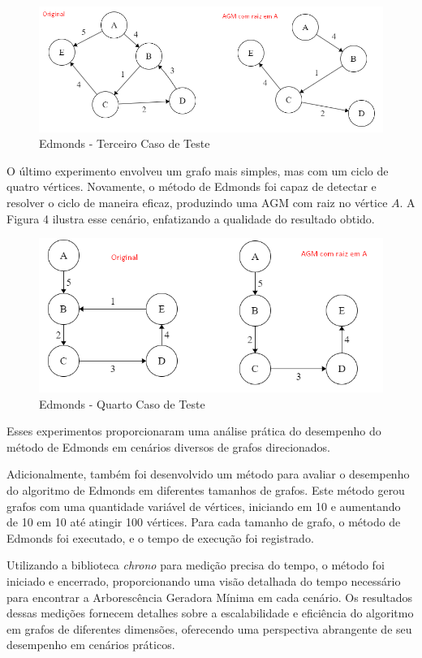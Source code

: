 \documentclass[12pt]{article}
\begin{document}
\begin{figure}[ht]
\centering
\includegraphics[width=.8\textwidth]{AGM/Exemplo 3.png}
\caption{Edmonds - Terceiro Caso de Teste}
\end{figure}

O último experimento envolveu um grafo mais simples, mas com um ciclo de quatro vértices. Novamente, o método de Edmonds foi capaz de detectar e resolver o ciclo de maneira eficaz, produzindo uma AGM com raiz no vértice \(A\). A Figura 4 ilustra esse cenário, enfatizando a qualidade do resultado obtido.

\begin{figure}[ht]
\centering
\includegraphics[width=.65\textwidth]{AGM/Exemplo 4.png}
\caption{Edmonds - Quarto Caso de Teste}
\end{figure}

Esses experimentos proporcionaram uma análise prática do desempenho do método de Edmonds em cenários diversos de grafos direcionados. 

Adicionalmente, também foi desenvolvido um método para avaliar o desempenho do algoritmo de Edmonds em diferentes tamanhos de grafos. Este método gerou grafos com uma quantidade variável de vértices, iniciando em 10 e aumentando de 10 em 10 até atingir 100 vértices. Para cada tamanho de grafo, o método de Edmonds foi executado, e o tempo de execução foi registrado. 

Utilizando a biblioteca \textit{chrono} para medição precisa do tempo, o método foi iniciado e encerrado, proporcionando uma visão detalhada do tempo necessário para encontrar a Arborescência Geradora Mínima em cada cenário. Os resultados dessas medições fornecem detalhes sobre a escalabilidade e eficiência do algoritmo em grafos de diferentes dimensões, oferecendo uma perspectiva abrangente de seu desempenho em cenários práticos.
\end{document}
